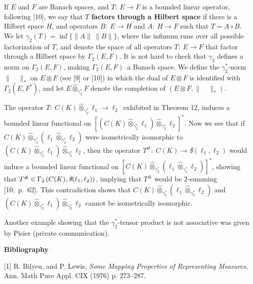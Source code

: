 If $E$ and $F$ are
Banach spaces, and $T:\ E\longrightarrow F$ is a bounded linear 
operator,
following [10], we say that $T$ {\bf factors through a Hilbert space} 
if
there is a Hilbert space $H$, and operators $B:\ E\longrightarrow H$ 
and $A:\
H\longrightarrow F$ such that $T=A\circ B$.  We let 
$\gamma_2(T)=\inf\{\parallel
A\parallel\ \parallel B\parallel \}$, where the infimum runs over all 
possible
factorization of $T$, and denote the space of all operators $T:\
E\longrightarrow F$ that factor through a Hilbert space by 
$\Gamma_2(E,F)$.  It
is not hard to check that $\gamma_2$ defines a norm on 
$\Gamma_2(E,F)$, making
$\Gamma_2(E,F)$\ a Banach space. We define the $\gamma_2^*$-norm
$\parallel\quad \parallel_*$ on $E\otimes F$ (see [9] or [10])
in which the dual of $E\otimes F$ is identified with
$\Gamma_2(E,F^*)$, and
let $E\hat \otimes_{\gamma^*_2}F$ denote the completion of $(E\otimes 
F,
\parallel\quad \parallel_*)$.

\medskip

The operator $T:\ C(K)\hat
\otimes_{\gamma^*_2}\ell_1\longrightarrow \ell_2$\ exhibited in 
Theorem 12,
induces a bounded linear functional on $\left[(C(K)\hat
\otimes_{\gamma^*_2}\ell_1)\hat \otimes_{\gamma^*_2}\ell_2\right]^*$.  
Now we
see that if $C(K)\hat \otimes_{\gamma^*_2}(\ell_1\hat
\otimes_{\gamma^*_2}\ell_2)$ were isometrically isomorphic to
$(C(K)\hat \otimes_{\gamma^*_2}\ell_1)\hat
\otimes_{\gamma^*_2}\ell_2$, then the operator $T^\#:\
C(K)\rightarrow ${\it \$}$(\ell_1, \ell_2)$ would induce a bounded 
linear
functional on $\left[C(K)\hat \otimes_{\gamma^*_2}(\ell_1\hat
\otimes_{\gamma^*_2}\ell_2)\right]^*$, showing that $T^\#\in
\Gamma_2\left(C(K),\text {\it \$}(\ell_1, \ell_2)\right)$, implying
that $T^\#$ would be 2-summing [10,~p.~62].  This contradiction shows 
that $C(K)
\hat \otimes_{\gamma^*_2}(\ell_1\hat \otimes_{\gamma^*_2}\ell_2)$ and
$\left(C(K)\hat \otimes_{\gamma^*_2}\ell_1\right)\hat
\otimes_{\gamma^*_2}\ell_2$ cannot be isometrically isomorphic.

\medskip

Another example showing that the $\gamma_2^*$-tensor product is not
associative was given by Pisier (private communication).

\vfill\eject

\centerline {\bf Bibliography}

\item {[1]} R. Bilyeu, and P. Lewis, {\it Some Mapping Properties of
Representing Measures}, Ann. Math Pure Appl. CIX (1976) p. 273--287.

